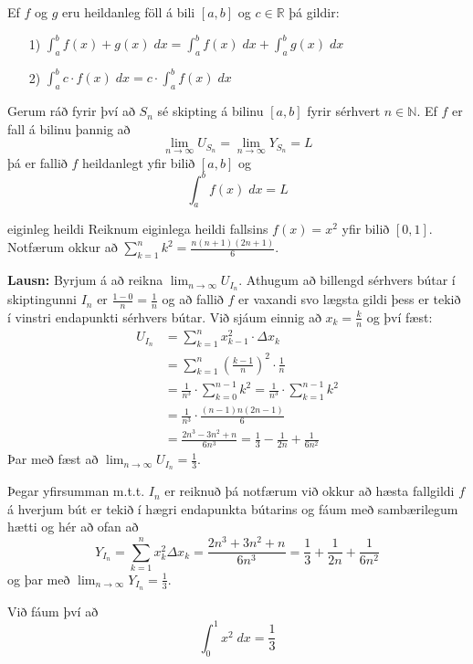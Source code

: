 \begin{regla}{}
Ef $f$ og $g$ eru heildanleg föll á bili $[a,b]$ og $c \in \mathbb{R}$ þá gildir:
\begin{itemize}
\item[1)] $\displaystyle \int_{a}^{b} f(x) + g(x) \; dx = \int_{a}^{b} f(x) \; dx + \int_{a}^{b} g(x) \; dx$

\item[2)] $\displaystyle \int_{a}^{b} c\cdot f(x) \; dx = c\cdot\int_{a}^{b} f(x) \; dx$
\end{itemize}
\end{regla}

\begin{regla}{}
Gerum ráð fyrir því að $S_{n}$ sé skipting á bilinu $[a,b]$ fyrir sérhvert $n \in \mathbb{N}$. Ef $f$ er fall á bilinu þannig að
$$
\lim_{n \to \infty} U_{S_{n}} = \lim_{n \to \infty} Y_{S_{n}} = L
$$
þá er fallið $f$ heildanlegt yfir bilið $[a,b]$ og
$$
\int_{a}^{b} f(x) \; dx = L
$$
\end{regla}

\begin{syn}{eiginleg heildi}
Reiknum eiginlega heildi fallsins $f(x) = x^2$ yfir bilið $[0,1]$. Notfærum okkur að $\displaystyle \sum_{k = 1}^{n} k^{2} = \frac{n(n+1)(2n+1)}{6}$.

{\bf Lausn:} Byrjum á að reikna $\displaystyle \lim_{n \to \infty} U_{I_{n}}$. Athugum að billengd sérhvers bútar í skiptingunni $I_n$ er $\frac{1-0}{n} = \frac{1}{n}$ og að fallið $f$ er vaxandi svo lægsta gildi þess er tekið í vinstri endapunkti sérhvers bútar. Við sjáum einnig að $x_{k} = \frac{k}{n}$ og því fæst:
\setlength{\jot}{4mm}
\begin{align*}
U_{I_{n}} &= \sum_{k = 1}^{n} x_{k-1}^{2}\cdot\Delta x_{k}\\ &= \sum_{k = 1}^{n} \left(\frac{k-1}{n}\right)^{2}\cdot\frac{1}{n}\\ &= \frac{1}{n^{3}}\cdot\sum_{k = 0}^{n-1} k^{2} = \frac{1}{n^{3}}\cdot\sum_{k = 1}^{n-1} k^{2}\\ &= \frac{1}{n^{3}} \cdot \frac{(n-1)n(2n-1)}{6}\\ &= \frac{2n^{3}-3n^{2}+n}{6n^{3}} = \frac{1}{3}-\frac{1}{2n}+\frac{1}{6n^{2}}
\end{align*}
Þar með fæst að $\displaystyle \lim_{n \to \infty} U_{I_{n}} = \frac{1}{3}$.

\vspace{2mm}

Þegar yfirsumman m.t.t. $I_{n}$ er reiknuð þá notfærum við okkur að hæsta fallgildi $f$ á hverjum bút er tekið í hægri endapunkta bútarins og fáum með sambærilegum hætti og hér að ofan að
$$
Y_{I_{n}} = \sum_{k = 1}^{n}x_{k}^{2}\Delta x_{k} = \frac{2n^{3}+3n^{2}+n}{6n^{3}} = \frac{1}{3}+\frac{1}{2n}+\frac{1}{6n^{2}}
$$
og þar með $\displaystyle \lim_{n \to \infty} Y_{I_{n}} = \frac{1}{3}$.

\vspace{2mm}

Við fáum því að
$$
\int_{0}^{1} x^{2}\;dx = \frac{1}{3}
$$

\end{syn}

